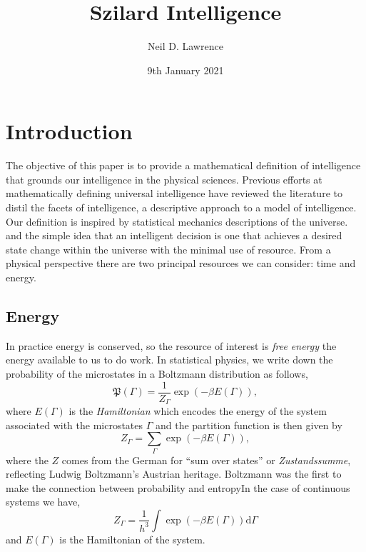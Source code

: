 \documentclass[]{article}
\title{Szilard Intelligence}
\author{Neil D. Lawrence}
\date{9th January 2021}
\begin{document}
\maketitle


\newcommand{\phaseVariables}{\Gamma}
\newcommand{\stateVariables}{X}
\newcommand{\nullVariables}{{X_0}}
\newcommand{\domainVariables}{{X_1}}
\newcommand{\dataVariables}{Y}
\newcommand{\measuredVariables}{S}
\newcommand{\measuredValue}{s}
\newcommand{\parameterVector}{W}
\newcommand{\separability}{{F_S}}
\newcommand{\expDist}[2]{\left\langle #1 \right\rangle_{#2}}
\newcommand{\trueProb}{\mathfrak{P}}
\newcommand{\simProb}{s}
\newcommand{\domainProb}{\hat{\mathbb{P}}}
\newcommand{\physicsProb}{p}
\newcommand{\approxProb}{q}
\newcommand{\statsProb}{\pi}




\section{Introduction}

The objective of this paper is to provide a mathematical definition of intelligence that grounds our intelligence in the physical sciences. Previous efforts at mathematically defining universal intelligence \citep{Legg-universal07} have reviewed the literature to distil the facets of intelligence, a descriptive approach to a model of intelligence. Our definition is inspired by statistical mechanics descriptions of the universe.  and the simple idea that an intelligent decision is one that achieves a desired state change within the universe with the minimal use of resource. From a physical perspective there are two principal resources we can consider: time and energy. 
\subsection{Energy}

In practice energy is conserved, so the resource of interest is \emph{free energy} the energy available to us to do work.  In statistical physics, we write down the probability of the microstates in a Boltzmann distribution as follows,
\[
\trueProb(\phaseVariables) = \frac{1}{Z_\phaseVariables} \exp(-\beta
E(\phaseVariables)),
\] 
where \(E(\phaseVariables)\) is the \emph{Hamiltonian} which encodes the energy of the system associated with the microstates \(\phaseVariables\) and the partition function is then given by 
\[
Z_\phaseVariables = \sum_\phaseVariables \exp(-\beta E(\phaseVariables)),
\] 
where the \(Z\) comes from the German for ``sum over states'' or
\emph{Zustandssumme}, reflecting Ludwig Boltzmann's Austrian heritage. Boltzmann was the first to make the connection between probability and entropy\citep{Boltzmann-warmetheorie77,}In the
case of continuous systems we have,
\[
Z_{\phaseVariables} = \frac{1}{h^3}\int \exp(-\beta E(\phaseVariables)) \text{d} \phaseVariables
\] 
and \(E(\phaseVariables)\) is the Hamiltonian of the system.
\end{document}
